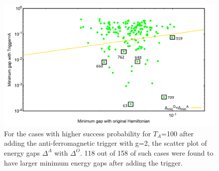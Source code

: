 \documentclass[../main.tex]{subfiles}
\begin{document}
\begin{figure}[H]
\centering 
\includegraphics[scale=0.35]{selected_T100_g2.png}
\caption{For the cases with higher success probability for $T_A$=100 after adding the anti-ferromagnetic trigger with g=2, the scatter plot of energy gaps $\Delta^A $ with $\Delta^O$. 118 out of 158 of such cases were found to have larger minimum energy gaps after adding the trigger.}
\label{fig:a40}
\end{figure}
\end{document}
